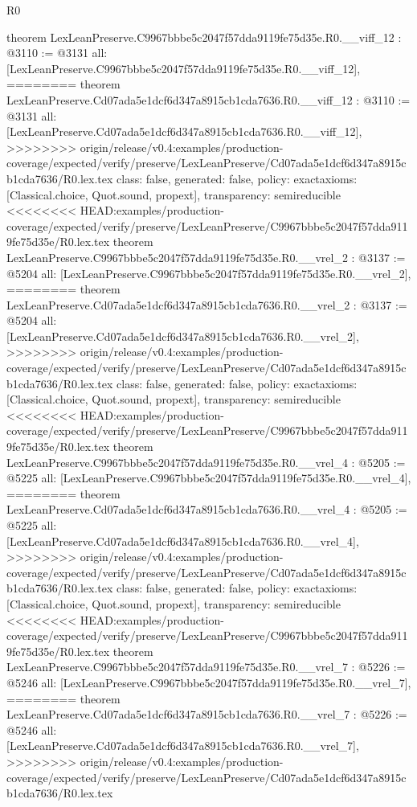 \begin{lexlean}{R0}
\begin{coremodule}
{{{{{{{{{{{{{{{{{{{{{{{{{{{{{{{{{{{{{{{{{{{{{{{{{{{{{{{{{{{{{{{{{{theorem LexLeanPreserve.C9967bbbe5c2047f57dda9119fe75d35e.R0.__viff_12 : @3110 := @3131 {
  all: [LexLeanPreserve.C9967bbbe5c2047f57dda9119fe75d35e.R0.__viff_12],
========
theorem LexLeanPreserve.Cd07ada5e1dcf6d347a8915cb1cda7636.R0.__viff_12 : @3110 := @3131 {
  all: [LexLeanPreserve.Cd07ada5e1dcf6d347a8915cb1cda7636.R0.__viff_12],
>>>>>>>> origin/release/v0.4:examples/production-coverage/expected/verify/preserve/LexLeanPreserve/Cd07ada5e1dcf6d347a8915cb1cda7636/R0.lex.tex
  class: false,
  generated: false,
  policy: exact{axioms: [Classical.choice, Quot.sound, propext]},
  transparency: semireducible
}
<<<<<<<< HEAD:examples/production-coverage/expected/verify/preserve/LexLeanPreserve/C9967bbbe5c2047f57dda9119fe75d35e/R0.lex.tex
theorem LexLeanPreserve.C9967bbbe5c2047f57dda9119fe75d35e.R0.__vrel_2 : @3137 := @5204 {
  all: [LexLeanPreserve.C9967bbbe5c2047f57dda9119fe75d35e.R0.__vrel_2],
========
theorem LexLeanPreserve.Cd07ada5e1dcf6d347a8915cb1cda7636.R0.__vrel_2 : @3137 := @5204 {
  all: [LexLeanPreserve.Cd07ada5e1dcf6d347a8915cb1cda7636.R0.__vrel_2],
>>>>>>>> origin/release/v0.4:examples/production-coverage/expected/verify/preserve/LexLeanPreserve/Cd07ada5e1dcf6d347a8915cb1cda7636/R0.lex.tex
  class: false,
  generated: false,
  policy: exact{axioms: [Classical.choice, Quot.sound, propext]},
  transparency: semireducible
}
<<<<<<<< HEAD:examples/production-coverage/expected/verify/preserve/LexLeanPreserve/C9967bbbe5c2047f57dda9119fe75d35e/R0.lex.tex
theorem LexLeanPreserve.C9967bbbe5c2047f57dda9119fe75d35e.R0.__vrel_4 : @5205 := @5225 {
  all: [LexLeanPreserve.C9967bbbe5c2047f57dda9119fe75d35e.R0.__vrel_4],
========
theorem LexLeanPreserve.Cd07ada5e1dcf6d347a8915cb1cda7636.R0.__vrel_4 : @5205 := @5225 {
  all: [LexLeanPreserve.Cd07ada5e1dcf6d347a8915cb1cda7636.R0.__vrel_4],
>>>>>>>> origin/release/v0.4:examples/production-coverage/expected/verify/preserve/LexLeanPreserve/Cd07ada5e1dcf6d347a8915cb1cda7636/R0.lex.tex
  class: false,
  generated: false,
  policy: exact{axioms: [Classical.choice, Quot.sound, propext]},
  transparency: semireducible
}
<<<<<<<< HEAD:examples/production-coverage/expected/verify/preserve/LexLeanPreserve/C9967bbbe5c2047f57dda9119fe75d35e/R0.lex.tex
theorem LexLeanPreserve.C9967bbbe5c2047f57dda9119fe75d35e.R0.__vrel_7 : @5226 := @5246 {
  all: [LexLeanPreserve.C9967bbbe5c2047f57dda9119fe75d35e.R0.__vrel_7],
========
theorem LexLeanPreserve.Cd07ada5e1dcf6d347a8915cb1cda7636.R0.__vrel_7 : @5226 := @5246 {
  all: [LexLeanPreserve.Cd07ada5e1dcf6d347a8915cb1cda7636.R0.__vrel_7],
>>>>>>>> origin/release/v0.4:examples/production-coverage/expected/verify/preserve/LexLeanPreserve/Cd07ada5e1dcf6d347a8915cb1cda7636/R0.lex.tex
}}}}}}}}}}}}}}}}}}}}}}}}}}}}}}}}}}}}}}}}}}}}}}}}}}}}}}}}}}}}}}}}}}}}}}}
\end{coremodule}
\end{lexlean}
